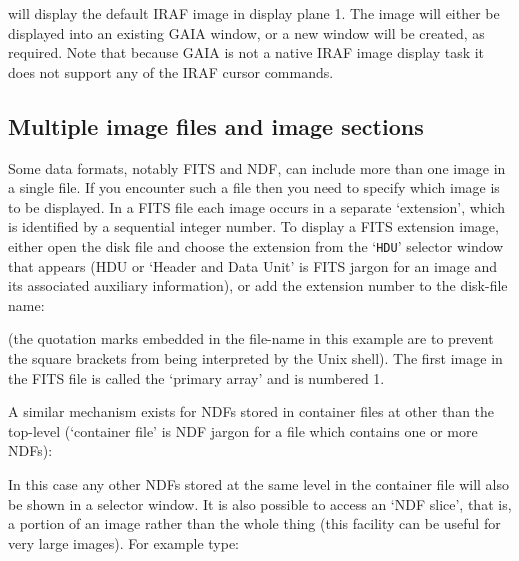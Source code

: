 \documentclass[twoside,11pt]{starlink}
\begin{document}

will display the default IRAF image in display plane 1.  The image will
either be displayed into an existing GAIA window, or a new window will
be created, as required.  Note that because GAIA is not a native IRAF
image display task it does not support any of the IRAF cursor commands.

\subsection{\label{MULT}Multiple image files and image sections}

Some data formats, notably FITS and NDF, can include more than one
image in a single file.  If you encounter such a file then you need to
specify which image is to be displayed.  In a FITS file each image occurs
in a separate `extension', which is identified by a sequential integer
number.  To display a FITS extension image, either open the disk file and
choose the extension from the `\texttt{HDU}' selector window that appears
(HDU or `Header and Data Unit' is FITS jargon for an image and its associated
auxiliary information), or add the extension number to the disk-file name:

\begin{terminalv}
\end{terminalv}

(the quotation marks embedded in the file-name in this example are to
prevent the square brackets from being interpreted by the Unix shell).
The first image in the FITS file is called the `primary array' and is
numbered 1.

A similar mechanism exists for NDFs stored in container files at other
than the top-level (`container file' is NDF jargon for a file which
contains one or more NDFs):

\begin{terminalv}
\end{terminalv}

In this case any other NDFs stored at the same level in the container
file will also be shown in a selector window.  It is also possible to
access an `NDF slice', that is, a portion of an image rather than the
whole thing (this facility can be useful for very large images).  For
example type:

\begin{terminalv}
\end{terminalv}
\end{document}
